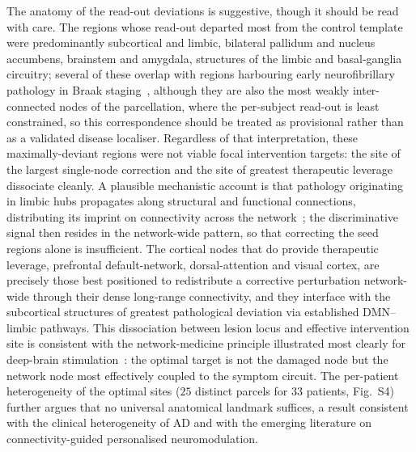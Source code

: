 \documentclass[11pt]{article}
\begin{document}
The anatomy of the read-out deviations is suggestive, though it should be read
with care. The regions whose read-out departed most from the control template
were predominantly subcortical and limbic, bilateral pallidum and nucleus
accumbens, brainstem and amygdala, structures of the limbic and basal-ganglia
circuitry; several of these overlap with regions harbouring early neurofibrillary
pathology in Braak staging~\cite{braak1991,braak2011}, although they are also the
most weakly inter-connected nodes of the parcellation, where the per-subject
read-out is least constrained, so this correspondence should be treated as
provisional rather than as a validated disease localiser. Regardless of that
interpretation, these maximally-deviant regions were not viable focal
intervention targets: the site of the largest single-node correction and the site
of greatest therapeutic leverage dissociate cleanly. A plausible mechanistic account is that pathology
originating in limbic hubs propagates along structural and functional connections,
distributing its imprint on connectivity across the network~\cite{raj2012,vogel2020};
the discriminative signal then resides in the network-wide pattern, so that
correcting the seed regions alone is insufficient. The cortical nodes that do
provide therapeutic leverage, prefrontal default-network, dorsal-attention and
visual cortex, are precisely those best positioned to redistribute a corrective
perturbation network-wide through their dense long-range connectivity, and they
interface with the subcortical structures of greatest pathological deviation via
established DMN--limbic pathways. This dissociation between lesion locus and
effective intervention site is consistent with the network-medicine principle
illustrated most clearly for deep-brain stimulation~\cite{fox2014}: the optimal
target is not the damaged node but the network node most effectively coupled to
the symptom circuit. The per-patient heterogeneity of the optimal sites ($25$ distinct parcels for $33$ patients, Fig.~S4) further argues that no universal
anatomical landmark suffices, a result consistent with the clinical heterogeneity
of AD and with the emerging literature on connectivity-guided personalised
neuromodulation.
\end{document}

